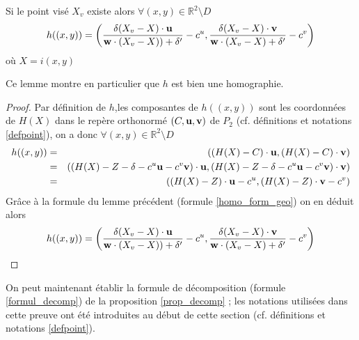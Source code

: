 \begin{lem}Si le point visé $X_v$ existe alors $\forall (x,y)\in \mathbb{R}^{2} \setminus D$ 
\begin{equation}
h((x,y))=\left(\frac{\delta (X_{v}-X)\cdot \mathbf{u}}{\mathbf{w} \cdot (X_v-X))+\delta'}-c^u,\frac{\delta (X_v-X)\cdot \mathbf{v}}{\mathbf{w} \cdot (X_v-X)+\delta'} -c^v \right) 
\label{homo_form_analytique}
\end{equation}
où $X=i(x,y)$
\label{lem_homo_form_analytique}
\end{lem}
Ce lemme montre en particulier que $h$ est bien une homographie.
\begin{proof}
Par définition de $h$,les composantes de $h((x,y))$ sont les coordonnées de $H(X)$ dans le repère orthonormé $(C,\mathbf{u},\mathbf{v})$ de $P_2$ (cf. définitions et notations \ref{defpoint}), on a donc $ \forall (x,y)\in \mathbb{R}^{2} \setminus D$
\begin{eqnarray*}
h((x,y)) &=& ((H(X)-C)\cdot \mathbf{u}, (H(X)-C)\cdot \mathbf{v})\\
     &=& ((H(X)-Z-\delta -c^u \mathbf{u} -c^v \mathbf{v})\cdot \mathbf{u}, (H(X)-Z-\delta -c^u \mathbf{u} -c^v \mathbf{v})\cdot \mathbf{v})\\
     &=& ((H(X)-Z)\cdot \mathbf{u} -c^u, (H(X)-Z)\cdot \mathbf{v} - c^v)
\end{eqnarray*}
Grâce à la formule du lemme précédent (formule \ref{homo_form_geo}) on en déduit alors 
\begin{equation*}
h((x,y))=\left(\frac{\delta (X_v-X)\cdot \mathbf{u}}{\mathbf{w} \cdot (X_v-X))+\delta'}-c^u,\frac{\delta (X_v-X)\cdot \mathbf{v}}{\mathbf{w} \cdot (X_v-X)+\delta'} -c^v \right) 
\end{equation*}
\end{proof}

On peut maintenant établir la formule de décomposition (formule \ref{formul_decomp}) de la proposition \ref{prop_decomp} ; les notations utilisées dans cette preuve ont été introduites au début de cette section (cf. définitions et notations \ref{defpoint}).

